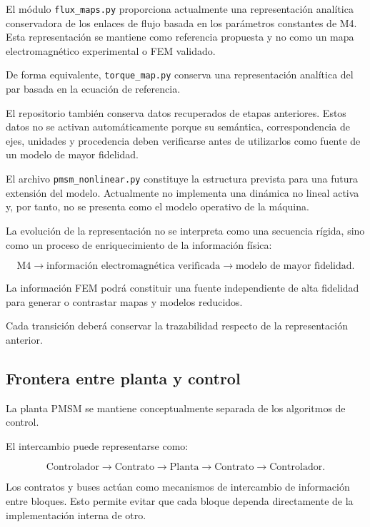 El módulo \texttt{flux\_maps.py} proporciona actualmente una representación analítica conservadora de los enlaces de flujo basada en los parámetros constantes de M4. Esta representación se mantiene como referencia propuesta y no como un mapa electromagnético experimental o FEM validado.

De forma equivalente, \texttt{torque\_map.py} conserva una representación analítica del par basada en la ecuación de referencia.

El repositorio también conserva datos recuperados de etapas anteriores. Estos datos no se activan automáticamente porque su semántica, correspondencia de ejes, unidades y procedencia deben verificarse antes de utilizarlos como fuente de un modelo de mayor fidelidad.

El archivo \texttt{pmsm\_nonlinear.py} constituye la estructura prevista para una futura extensión del modelo. Actualmente no implementa una dinámica no lineal activa y, por tanto, no se presenta como el modelo operativo de la máquina.

La evolución de la representación no se interpreta como una secuencia rígida, sino como un proceso de enriquecimiento de la información física:

\begin{equation}
\text{M4}
\rightarrow
\text{información electromagnética verificada}
\rightarrow
\text{modelo de mayor fidelidad}.
\end{equation}

La información FEM podrá constituir una fuente independiente de alta fidelidad para generar o contrastar mapas y modelos reducidos.

Cada transición deberá conservar la trazabilidad respecto de la representación anterior.

\subsection{Frontera entre planta y control}

La planta PMSM se mantiene conceptualmente separada de los algoritmos de control.

El intercambio puede representarse como:

\begin{equation}
\mathrm{Controlador}
\rightarrow
\mathrm{Contrato}
\rightarrow
\mathrm{Planta}
\rightarrow
\mathrm{Contrato}
\rightarrow
\mathrm{Controlador}.
\end{equation}

Los contratos y buses actúan como mecanismos de intercambio de información entre bloques. Esto permite evitar que cada bloque dependa directamente de la implementación interna de otro.

